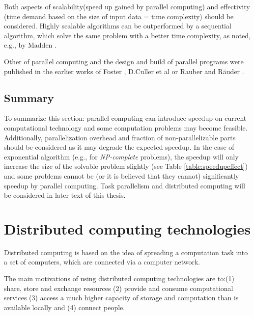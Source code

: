 Both aspects of scalability(speed up gained by parallel computing) and effectivity (time demand based on the size of input data = time complexity) should be considered. Highly scalable algorithms can be outperformed by a sequential algorithm, which solve the same problem with a better time complexity, as noted, e.g., by Madden \cite{Madden2012}. 

Other of parallel computing and the design and build of parallel programs were published in the earlier works of Foster \cite{Foster1995}, D.Culler et al  \cite{Culer1998} or Rauber and Räuder \cite{Rauber2013}. 

\subsection{Summary}

To summarize this section: parallel computing can introduce speedup on current computational technology and some computation problems may become feasible.
Additionally, parallelization overhead and fraction of non-parallelizable parts should be considered as it may degrade the expected speedup.
In the case of exponential algorithm (e.g., for \emph{NP-complete} problems), the speedup will only increase the size of the solvable problem slightly (see Table \ref{table:speedupeffect}) and some problems cannot be (or it is believed that they cannot) significantly speedup by parallel computing. 
Task parallelism and distributed computing will be considered in later text of this thesis.

\section{Distributed computing technologies}
\label{sec:distributed}

Distributed computing is based on the idea of spreading a computation task into a set of computers, which are connected via a computer network.

The main motivations of using distributed computing technologies are to:(1) share, store and exchange resources (2) provide and consume computational services (3) access a much higher capacity of storage and computation than is available locally and (4) connect people.

